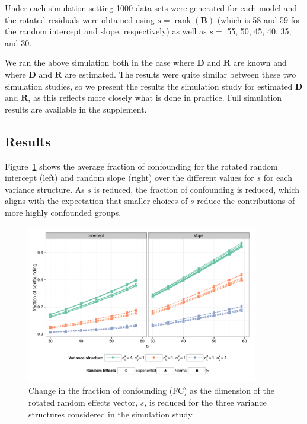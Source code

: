 \documentclass[12pt]{article} %
\newcommand{\al}[1]{{\color{red} #1}}
\DeclareMathOperator{\rank}{rank}
\begin{document}
Under each simulation setting 1000 data sets were generated for each model and the rotated residuals were obtained using $s = \rank(\bm{B})$ (which is 58 and 59 for the random intercept and slope, respectively) as well as $s =$ 55, 50, 45, 40, 35, and 30. 

\al{We ran the above simulation both in the case where $\bm{D}$ and $\bm{R}$ are known and where $\bm{D}$ and $\bm{R}$ are estimated. The results were quite similar between these two simulation studies, so we present the results the simulation study for estimated  $\bm{D}$ and $\bm{R}$, as this reflects more closely what is done in practice. Full simulation results are available in the supplement.}


\subsection{Results}\label{sec:sim-results}
\noindent
Figure~\ref{fig:fc} shows the average fraction of confounding for the rotated random intercept (left) and random slope (right) over the different values for $s$ for each variance structure. As $s$ is reduced, the fraction of confounding is reduced, which aligns with the expectation that smaller choices of $s$ reduce the contributions of more highly confounded groups.

\begin{figure}[h]
	\centering
	\includegraphics[width=0.9\textwidth]{fc_by_s.pdf}
	\caption{\label{fig:fc} Change in the fraction of confounding (FC) as the dimension of the rotated random effects vector, $s$, is reduced for the three variance structures considered in the simulation study. %
	}
\end{figure}
\end{document}
